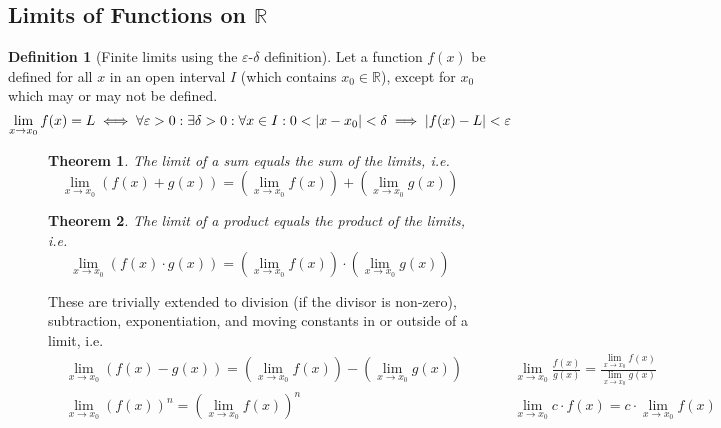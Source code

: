 \documentclass{article}
\newcommand*{\R}{\mathbb{R}}
\theoremstyle{plain}
\newtheorem{theorem}{Theorem}[section]
\numberwithin{theorem}{subsection}
\theoremstyle{definition}
\newtheorem{definition}{Definition}[section]
\numberwithin{definition}{subsection}
\theoremstyle{remark}
\numberwithin{note}{subsection}
\begin{document}
\subsection{Limits of Functions on \texorpdfstring{$\mathbb{R}$}{the Reals}}
\begin{definition}[Finite limits using the $\varepsilon$-$\delta$ definition]
    Let a function $f(x)$ be defined for all $x$ in an open interval $I$
    (which contains $x_0 \in \R$), except for $x_0$ which may or may not be defined.
    \begin{equation*}
        \lim_{x\to x_0} f(x) = L \iff \forall\varepsilon>0: \exists\delta>0: \forall x \in I: 0<\abs{x-x_0}<\delta \implies \abs{f(x)-L}<\varepsilon
    \end{equation*}
\end{definition}
%
\begin{figure}[H]
    \begin{mdframed}[style=exampledefault,frametitle={Limit Laws for Functions}]
        \begin{theorem} The limit of a sum equals the sum of the limits, i.e.
            \begin{equation*}
                \lim_{x\to x_0}\left(f(x)+g(x)\right)
                = \left(\lim_{x\to x_0}f(x)\right) + \left(\lim_{x\to x_0}g(x)\right)
            \end{equation*}
        \end{theorem}
        \begin{theorem} The limit of a product equals the product of the limits, i.e.
            \begin{equation*}
                \lim_{x\to x_0}\left(f(x)\cdot g(x)\right)
                = \left(\lim_{x\to x_0}f(x)\right) \cdot \left(\lim_{x\to x_0}g(x)\right)
            \end{equation*}
        \end{theorem}
        These are trivially extended to
        division (if the divisor is non-zero),
        subtraction, exponentiation, and moving constants in or outside of a limit, i.e.
        \begin{align*}
             & \lim_{x\to x_0}\left(f(x) - g(x)\right)
            = \left(\lim_{x\to x_0}f(x)\right) - \left(\lim_{x\to x_0}g(x)\right)
             & \qquad
             & \lim_{x\to x_0}\frac{f(x)}{g(x)}
            = \frac{\lim_{x\to x_0}f(x)}{\lim_{x\to x_0}g(x)}
            \\
             & \lim_{x\to x_0}\left(f(x)\right)^n
            = \left(\lim_{x\to x_0}f(x)\right)^n
             & \qquad
             & \lim_{x\to x_0} c \cdot f(x)
            = c \cdot \lim_{x\to x_0}f(x)
        \end{align*}
    \end{mdframed}
\end{figure}
\end{document}
